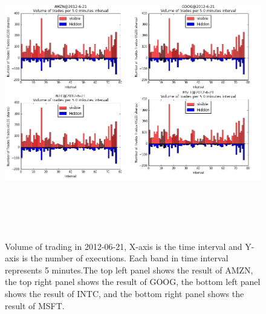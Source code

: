 \begin{figure} [hp]
  \begin{center}
    \includegraphics[width=6in,  height=5in]{figures/volume_trade.png}
  \end{center}
\caption{Volume of trading in 2012-06-21,  X-axis is the time interval and Y-axis is the number of executions. Each band in time interval represents 5 minutes.The top left panel shows the result of AMZN,   the top right panel shows the result of GOOG,  the bottom left panel shows the result of INTC,   and the bottom right panel shows the result of MSFT.  } \label{fig:volume_trade}
\end{figure}

